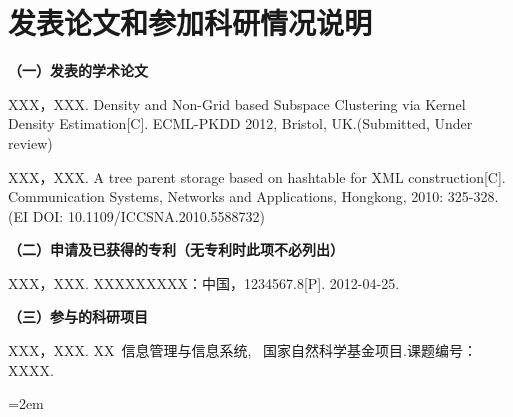 
\chapter*{发表论文和参加科研情况说明}
\setlength{\parindent}{0em}
\textbf{（一）发表的学术论文}
\begin{publist}
\item XXX，XXX. Density and Non-Grid based Subspace Clustering via Kernel Density Estimation[C]. ECML-PKDD 2012, Bristol, UK.(Submitted, Under review)
\item XXX，XXX. A tree parent storage based on hashtable for XML construction[C]. Communication Systems, Networks and Applications, Hongkong, 2010: 325-328. (EI DOI: 10.1109/ICCSNA.2010.5588732)
\end{publist}

\vspace*{1em}
\textbf{（二）申请及已获得的专利（无专利时此项不必列出）}
\begin{publist}
\item XXX，XXX. XXXXXXXXX：中国，1234567.8[P]. 2012-04-25.
\end{publist}
\vspace*{1em}
\textbf{（三）参与的科研项目}
\begin{publist}
\item	XXX，XXX. XX~信息管理与信息系统, ~国家自然科学基金项目.课题编号：XXXX.
\end{publist}
\vfill
{}\hangindent=2em\noindent

\setlength{\parindent}{2em}
